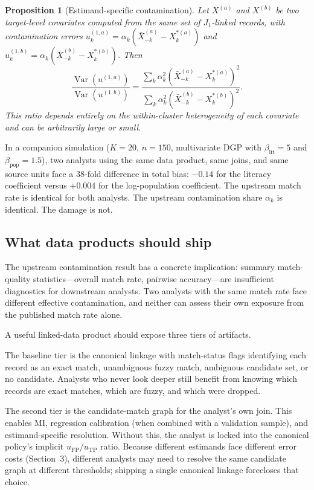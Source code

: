 \documentclass[12pt]{article}
\newtheorem{proposition}{Proposition}
\theoremstyle{remark}
\begin{document}
\begin{proposition}[Estimand-specific contamination]
Let $X^{(a)}$ and $X^{(b)}$ be two target-level covariates computed from the same set of $J_1$-linked records, with contamination errors $u_k^{(1,a)} = \alpha_k(\bar X_{-k}^{(a)} - X_k^{*(a)})$ and $u_k^{(1,b)} = \alpha_k(\bar X_{-k}^{(b)} - X_k^{*(b)})$. Then
\[
    \frac{\operatorname{Var}(u^{(1,a)})}{\operatorname{Var}(u^{(1,b)})}
    =
    \frac{\sum_k \alpha_k^2 (\bar X_{-k}^{(a)} - X_k^{*(a)})^2}
         {\sum_k \alpha_k^2 (\bar X_{-k}^{(b)} - X_k^{*(b)})^2}.
\]
This ratio depends entirely on the within-cluster heterogeneity of each covariate and can be arbitrarily large or small.
\end{proposition}

In a companion simulation ($K=20$, $n=150$, multivariate DGP with $\beta_{\mathrm{lit}}=5$ and $\beta_{\mathrm{pop}}=1.5$), two analysts using the same data product, same joins, and same source units face a 38-fold difference in total bias: $-0.14$ for the literacy coefficient versus $+0.004$ for the log-population coefficient. The upstream match rate is identical for both analysts. The upstream contamination share $\alpha_k$ is identical. The damage is not.

\subsection{What data products should ship}

The upstream contamination result has a concrete implication: summary match-quality statistics---overall match rate, pairwise accuracy---are insufficient diagnostics for downstream analysts. Two analysts with the same match rate face different effective contamination, and neither can assess their own exposure from the published match rate alone.

A useful linked-data product should expose three tiers of artifacts.

The baseline tier is the canonical linkage with match-status flags identifying each record as an exact match, unambiguous fuzzy match, ambiguous candidate set, or no candidate. Analysts who never look deeper still benefit from knowing which records are exact matches, which are fuzzy, and which were dropped.

The second tier is the candidate-match graph for the analyst's own join. This enables MI, regression calibration (when combined with a validation sample), and estimand-specific resolution. Without this, the analyst is locked into the canonical policy's implicit $u_{\mathrm{FP}}/u_{\mathrm{TP}}$ ratio. Because different estimands face different error costs (Section~3), different analysts may need to resolve the same candidate graph at different thresholds; shipping a single canonical linkage forecloses that choice.
\end{document}
